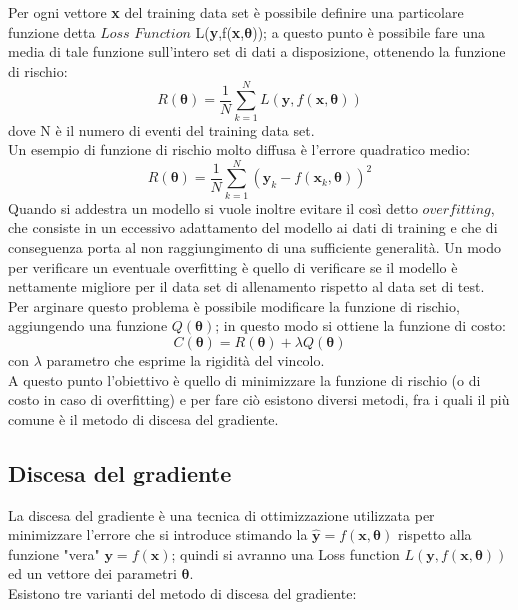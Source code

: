 Per ogni vettore \textbf{x} del training data set è possibile definire una particolare funzione detta $\textit{Loss Function}$ L(\textbf{y},f(\textbf{x},$\bm{\theta}$)); a questo punto è possibile fare una media di tale funzione sull'intero set di dati a disposizione, ottenendo la funzione di rischio: \\
\begin{equation}
R(\bm{\theta}) = \frac{1}{N}\sum_{k=1}^{N}L(\textbf{y},f(\textbf{x},\bm{\theta}))
\end{equation}
dove N è il numero di eventi del training data set. \\
Un esempio di funzione di rischio molto diffusa è l'errore quadratico medio:
\begin{equation}
R(\bm{\theta}) = \frac{1}{N}\sum_{k=1}^{N}(\textbf{y}_k - f(\textbf{x}_k , \bm{\theta}))^2
\end{equation}
Quando si addestra un modello si vuole inoltre evitare il così detto $\textit{overfitting}$, che consiste in un eccessivo adattamento del modello ai dati di training e che di conseguenza porta al non raggiungimento di una sufficiente generalità. Un modo per verificare un eventuale overfitting è quello di verificare se il modello è nettamente migliore per il data set di allenamento rispetto al data set di test. \\
Per arginare questo problema è possibile modificare la funzione di rischio, aggiungendo una funzione $Q(\bm{\theta})$; in questo modo si ottiene la funzione di costo:
\begin{equation}
C(\bm{\theta}) = R(\bm{\theta}) + \lambda Q(\bm{\theta})
\end{equation}
con $\lambda$ parametro che esprime la rigidità del vincolo.\\
A questo punto l'obiettivo è quello di minimizzare la funzione di rischio (o di costo in caso di overfitting) e per fare ciò esistono diversi metodi, fra i quali il più comune è il metodo di discesa del gradiente.

\newpage


\subsection{Discesa del gradiente}
\label{discesa del gradiente}
La discesa del gradiente è una tecnica di ottimizzazione utilizzata per minimizzare l'errore che si introduce stimando la $\hat{\textbf{y}} = f(\textbf{x},\bm{\theta})$ rispetto alla funzione "vera" $\textbf{y} = f(\textbf{x})$; quindi si avranno una Loss function $L(\textbf{y},f(\textbf{x},\bm{\theta}))$ ed un vettore dei parametri $\bm{\theta}$.\\
Esistono tre varianti del metodo di discesa del gradiente:


